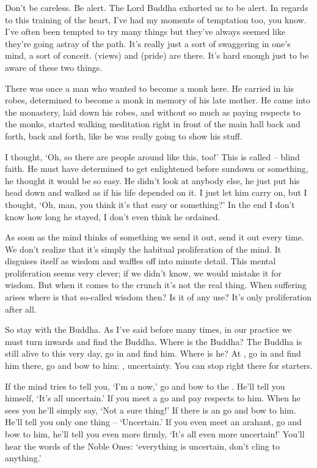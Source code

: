 Don't be careless. Be alert. The Lord Buddha exhorted us to be alert. In regards to this training of the heart, I've had my moments of temptation too, you know. I've often been tempted to try many things but they've always seemed like they're going astray of the path. It's really just a sort of swaggering in one's mind, a sort of conceit.  (views) and  (pride) are there. It's hard enough just to be aware of these two things. 

There was once a man who wanted to become a monk here. He carried in his robes, determined to become a monk in memory of his late mother. He came into the monastery, laid down his robes, and without so much as paying respects to the monks, started walking meditation right in front of the main hall back and forth, back and forth, like he was really going to show his stuff. 

I thought, `Oh, so there are people around like this, too!' This is called   -- blind faith. He must have determined to get enlightened before sundown or something, he thought it would be so easy. He didn't look at anybody else, he just put his head down and walked as if his life depended on it. I just let him carry on, but I thought, `Oh, man, you think it's that easy or something?' In the end I don't know how long he stayed, I don't even think he ordained. 

As soon as the mind thinks of something we send it out, send it out every time. We don't realize that it's simply the habitual proliferation of the mind. It disguises itself as wisdom and waffles off into minute detail. This mental proliferation seems very clever; if we didn't know, we would mistake it for wisdom. But when it comes to the crunch it's not the real thing. When suffering arises where is that so-called wisdom then? Is it of any use? It's only proliferation after all. 

So stay with the Buddha. As I've said before many times, in our practice we must turn inwards and find the Buddha. Where is the Buddha? The Buddha is still alive to this very day, go in and find him. Where is he? At , go in and find him there, go and bow to him: , uncertainty. You can stop right there for starters. 

If the mind tries to tell you, `I'm a  now,' go and bow to the . He'll tell you himself, `It's all uncertain.' If you meet a  go and pay respects to him. When he sees you he'll simply say, `Not a sure thing!' If there is an  go and bow to him. He'll tell you only one thing -- `Uncertain.' If you even meet an arahant, go and bow to him, he'll tell you even more firmly, `It's all even more uncertain!' You'll hear the words of the Noble Ones: `everything is uncertain, don't cling to \mbox{anything.'} 

